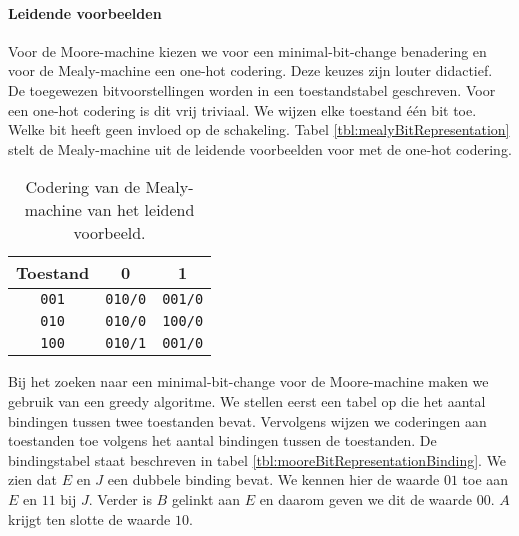\paragraph{Leidende voorbeelden}Voor de Moore-machine kiezen we voor een minimal-bit-change benadering en voor de Mealy-machine een one-hot codering. Deze keuzes zijn louter didactief. De toegewezen bitvoorstellingen worden in een toestandstabel geschreven. Voor een one-hot codering is dit vrij triviaal. We wijzen elke toestand \'e\'en bit toe. Welke bit heeft geen invloed op de schakeling. Tabel \ref{tbl:mealyBitRepresentation} stelt de Mealy-machine uit de leidende voorbeelden voor met de one-hot codering.
\begin{table}[hbt]
\centering
\begin{tabular}{c|cc}
Toestand&0&1\\\hline
\texttt{001}&\texttt{010/0}&\texttt{001/0}\\
\texttt{010}&\texttt{010/0}&\texttt{100/0}\\
\texttt{100}&\texttt{010/1}&\texttt{001/0}\\
\end{tabular}
\caption{Codering van de Mealy-machine van het leidend voorbeeld.}
\end{table}
Bij het zoeken naar een minimal-bit-change voor de Moore-machine maken we gebruik van een greedy algoritme. We stellen eerst een tabel op die het aantal bindingen tussen twee toestanden bevat. Vervolgens wijzen we coderingen aan toestanden toe volgens het aantal bindingen tussen de toestanden. De bindingstabel staat beschreven in tabel \ref{tbl:mooreBitRepresentationBinding}. We zien dat $E$ en $J$ een dubbele binding bevat. We kennen hier de waarde $01$ toe aan $E$ en $11$ bij $J$. Verder is $B$ gelinkt aan $E$ en daarom geven we dit de waarde $00$. $A$ krijgt ten slotte de waarde $10$.
\begin{table}[hbt]
\centering
{}
\caption{Codering van de Moore-machine van het leidend voorbeeld.}
\end{table}
